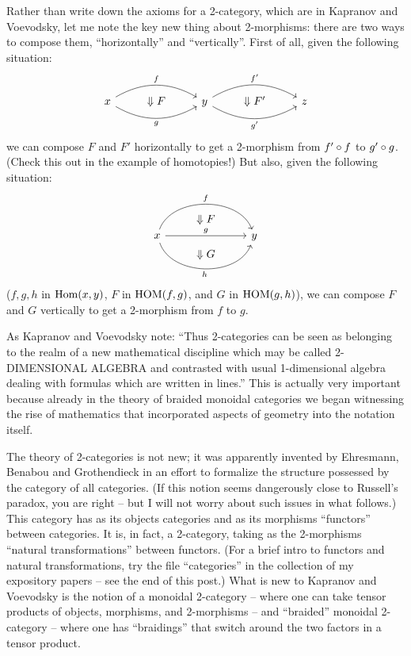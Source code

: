 Rather than write down the axioms for a 2-category, which are in
Kapranov and Voevodsky, let me note the key new thing about 2-morphisms:
there are two ways to compose them, ``horizontally'' and ``vertically''.
First of all, given the following situation:
\[
\begin{tikzcd}
   x
   \arrow[rr, bend left,"f"]
   \arrow[rr, bend right,"g",swap]
   &
   \zwei F
   &
   y
   \arrow[rr, bend left,"f'"]
   \arrow[rr, bend right,"g'",swap]
   &
   \zwei F'
   &
   z
\end{tikzcd}
\]
we can compose $F$ and $F'$ horizontally to get a 2-morphism from $f' \circ f$ to
$g' \circ g$.  (Check this out in the example of homotopies!)  But also, given
the following situation:
\[
\begin{tikzcd}[row sep = 0.1em]
   &
   \zwei F
   \\
   x
   \arrow[rr, bend left=70,"f"]
   \arrow[rr,"g"]
   \arrow[rr, bend right=70,"h",swap]
   &&
   y
   \\
   &
   \zwei G
\end{tikzcd}
\]
($f,g,h$ in ${\rm Hom}(x,y)$, $F$ in ${\rm HOM}(f,g)$, and $G$ in ${\rm HOM}(g,h)$), we can
compose $F$ and $G$ vertically to get a 2-morphism from $f$ to $g$.  

As Kapranov and Voevodsky note: ``Thus 2-categories can be seen as
belonging to the realm of a new mathematical discipline which may be
called 2-DIMENSIONAL ALGEBRA and contrasted with usual 1-dimensional
algebra dealing with formulas which are written in lines.''  This is
actually very important because already in the theory of braided
monoidal categories we began witnessing the rise of mathematics that
incorporated aspects of geometry into the notation itself. 

The theory of 2-categories is not new; it was apparently invented by
Ehresmann, Benabou and Grothendieck in an effort to formalize the
structure possessed by the category of all categories.  (If this notion
seems dangerously close to Russell's paradox, you are right -- but I will
not worry about such issues in what follows.)  This category has as its
objects categories and as its morphisms ``functors'' between categories.  It
is, in fact, a 2-category, taking as the 2-morphisms ``natural
transformations'' between functors.  (For a brief intro to functors and
natural transformations, try the file ``categories'' in the collection of
my expository papers -- see the end of this post.)  What is new to
Kapranov and Voevodsky is the notion of a monoidal 2-category --
where one can take tensor products of objects, morphisms, and
2-morphisms -- and ``braided'' monoidal 2-category -- where one has
``braidings'' that switch around the two factors in a tensor product.  

